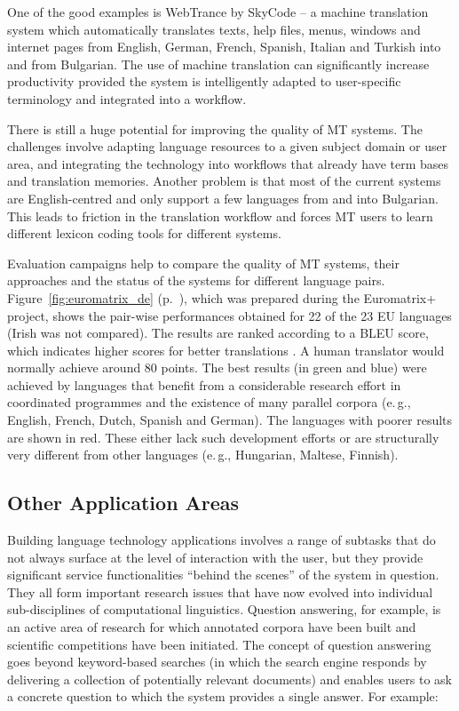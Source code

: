 \documentclass[]{../../metanetpaper}
\begin{document}
\begin{multicols}{2}
One of the good examples is WebTrance by SkyCode – a machine translation system which automatically translates texts, help files, menus, windows and internet pages from English, German, French, Spanish, Italian and Turkish into and from Bulgarian.  The use of machine translation can significantly increase productivity provided the system is intelligently adapted to user-specific terminology and integrated into a workflow. 

There is still a huge potential for improving the quality of MT systems. The challenges involve adapting language resources to a given subject domain or user area, and integrating the technology into workflows that already have term bases and translation memories. Another problem is that most of the current systems are English-centred and only support a few languages from and into Bulgarian. This leads to friction in the translation workflow and forces MT users to learn different lexicon coding tools for different systems.

Evaluation campaigns help to compare the quality of MT systems, their approaches and the status of the systems for different language pairs. Figure~\ref{fig:euromatrix_de} (p.~\pageref{fig:euromatrix_de}), which was prepared during the Euromatrix+ project, shows the pair-wise performances obtained for 22 of the 23 EU languages (Irish was not compared). The results are ranked according to a BLEU score, which indicates higher scores for better translations \cite{bleu1}. A human translator would normally achieve around 80 points. The best results (in green and blue) were achieved by languages that benefit from a considerable research effort in coordinated programmes and the existence of many parallel corpora (e.\,g., English, French, Dutch, Spanish and German). The languages with poorer results are shown in red. These either lack such development efforts or are structurally very different from other languages (e.\,g., Hungarian, Maltese, Finnish).

\subsection{Other Application Areas}

Building language technology applications involves a range of subtasks that do not always surface at the level of interaction with the user, but they provide significant service functionalities “behind the scenes” of the system in question. They all form important research issues that have now evolved into individual sub-disciplines of computational linguistics. Question answering, for example, is an active area of research for which annotated corpora have been built and scientific competitions have been initiated. The concept of question answering goes beyond keyword-based searches (in which the search engine responds by delivering a collection of potentially relevant documents) and enables users to ask a concrete question to which the system provides a single answer. For example:


\end{multicols}
\end{document}
